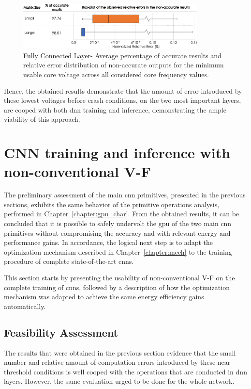 \begin{figure}[htbp]
    \centering
        \includegraphics[width=0.85\textwidth]{Figures/Application To Deep Learning/MatrixMul_Error_Distribution.pdf}
        \caption{Fully Connected Layer- Average percentage of accurate results and relative error distribution of non-accurate outputs for the minimum usable core voltage across all considered core frequency values.}
    \label{fig:MatrixMult_errors}
\end{figure}

Hence, the obtained results demonstrate that the amount of error introduced by these lowest voltages before crash conditions, on the two most important layers, are cooped with both \acrshort{dnn} training and inference, demonstrating the ample viability of this approach.


\section{CNN training and inference with non-conventional V-F}
\label{section:enhanced}

The preliminary assessment of the main \acrshort{cnn} primitives, presented in the previous sections, exhibits the same behavior of the primitive operations analysis, performed in Chapter~\ref{chapter:gpu_char}. From the obtained results, it can be concluded that it is possible to safely undervolt the \acrshort{gpu} of the two main \acrshort{cnn} primitives without compromising the accuracy and with relevant energy and performance gains. In accordance, the logical next step is to adapt the optimization mechanism described in Chapter~\ref{chapter:mech} to the training procedure of complete state-of-the-art \acrshort{cnn}s.


This section starts by presenting the usability of non-conventional V-F on the complete training of \acrshort{cnn}s, followed by a description of how the optimization mechanism was adapted to achieve the same energy efficiency gains automatically.

\subsection{Feasibility Assessment}
\label{sec:fea_ass}
The results that were obtained in the previous section evidence that the small number and relative amount of computation errors introduced by these near threshold conditions is well cooped with the operations that are conducted in \acrshort{dnn} layers. However, the same evaluation urged to be done for the whole network.


